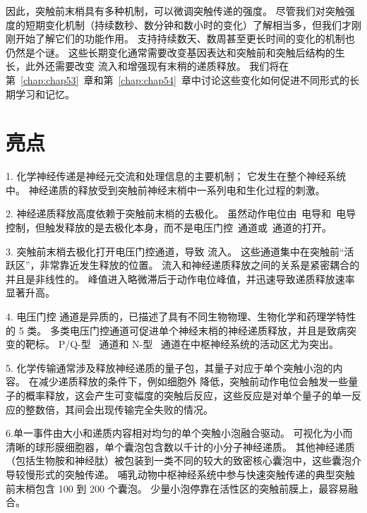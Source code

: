 因此，突触前末梢具有多种机制，可以微调突触传递的强度。
尽管我们对突触强度的短期变化机制（持续数秒、数分钟和数小时的变化）了解相当多，但我们才刚刚开始了解它们的功能作用。
支持持续数天、数周甚至更长时间的变化的机制也仍然是个谜。
这些长期变化通常需要改变基因表达和突触前和突触后结构的生长，此外还需要改变  流入和增强现有末稍的递质释放。
我们将在第~\ref{chap:chap53}~章和第~\ref{chap:chap54}~章中讨论这些变化如何促进不同形式的长期学习和记忆。



\section{亮点}

1. 化学神经传递是神经元交流和处理信息的主要机制； 它发生在整个神经系统中。
神经递质的释放受到突触前神经末梢中一系列电和生化过程的刺激。


2. 神经递质释放高度依赖于突触前末梢的去极化。
虽然动作电位由~电导和~电导控制，但触发释放的是去极化本身，而不是电压门控~通道或~通道的打开。


3. 突触前末梢去极化打开电压门控通道，导致  流入。
这些通道集中在突触前“活跃区”，非常靠近发生释放的位置。
 流入和神经递质释放之间的关系是紧密耦合的并且是非线性的。
 峰值进入略微滞后于动作电位峰值，并迅速导致递质释放速率显著升高。 


4. 电压门控 通道是异质的，已描述了具有不同生物物理、生物化学和药理学特性的 5 类。
多类电压门控通道可促进单个神经末梢的神经递质释放，并且是致病突变的靶标。
P/Q-型~ 通道和 N-型~ 通道在中枢神经系统的活动区尤为突出。


5. 化学传输通常涉及释放神经递质的量子包，其量子对应于单个突触小泡的内容。
在减少递质释放的条件下，例如细胞外  降低，突触前动作电位会触发一些量子的概率释放，这会产生可变幅度的突触后反应，这些反应是对单个量子的单一反应的整数倍，其间会出现传输完全失败的情况。


6.单一事件由大小和递质内容相对均匀的单个突触小泡融合驱动。
可视化为小而清晰的球形膜细胞器，单个囊泡包含数以千计的小分子神经递质。
其他神经递质（包括生物胺和神经肽）被包装到一类不同的较大的致密核心囊泡中，这些囊泡介导较慢形式的突触传递。
哺乳动物中枢神经系统中参与快速突触传递的典型突触前末梢包含 100 到 200 个囊泡。
少量小泡停靠在活性区的突触前膜上，最容易融合。


